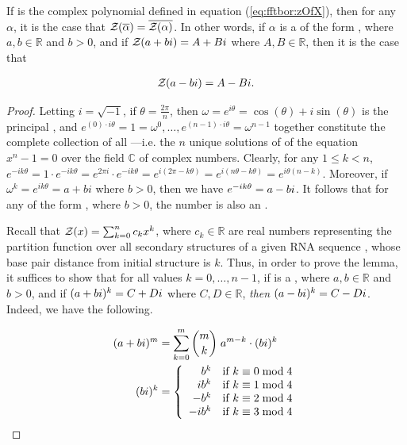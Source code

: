 \begin{lemma}
\label{lem:fftbor:compconj}

If \emZ{} is the complex polynomial defined in
equation (\ref{eq:fftbor:zOfX}), then for any \nRoU
 $\alpha$, it is the case that ${\mathcal Z}_{}(\overline{\alpha}) =
\overline{{\mathcal Z}_{}(\alpha)}$. In other words, if $\alpha$ is a \nRoU
 of the form \aPbi, where $a,b \in \mathbb{R}$ and $b>0$, and
if ${\mathcal Z}_{}(a+bi) = A + Bi$ where $A,B \in \mathbb{R}$, then it is the case that

\begin{align}
{\mathcal Z}_{}(a-bi) = A - Bi.
\end{align}

\end{lemma}

\begin{proof}
Letting $i = \sqrt{-1}$, if
$\theta = \frac{2 \pi}{n}$, then
$\omega = e^{i \theta} = \cos(\theta) + i \sin(\theta)$
is the principal \nRoU, and
$e^{(0) \cdot i \theta} = 1 = \omega^{0}, \dots ,
e^{(n-1) \cdot i \theta} = \omega^{n-1}$ together
constitute the complete collection of all
\nRoUs---i.e. the $n$ unique solutions of
of the equation $x^n -1 = 0$ over the field $\mathbb{C}$ of complex numbers.
Clearly, for any $1 \leq k < n$,
$e^{-i k \theta} = 1 \cdot e^{-i k \theta} =
e^{2 \pi i} \cdot e^{-i k \theta} = e^{i(2 \pi - k \theta)} =
e^{i(n \theta - k \theta)} = e^{i \theta (n - k)}$.
Moreover, if $\omega^k = e^{i k \theta} = a + b i$ where
$b>0$, then we have $e^{-i k \theta} = a-bi$. It follows that for any
\nRoU of the form \aPbi, where $b>0$, the number \aMbi
is also an \nRoU.

Recall that ${\mathcal Z}_{}(x) = \sum_{k=0}^n c_k x^k$, where
$c_k \in \mathbb{R}$ are real numbers representing the partition function
 over
all secondary structures of a given RNA sequence \seqN,
whose base pair distance from initial structure
\strSt is $k$. Thus, in order to prove the lemma, it suffices to show
that for all values $k=0,\dots,n-1$, if \aPbi is a
\nRoU, where $a,b \in \mathbb{R}$
and $b>0$, and if $(a+bi)^k = C+Di$ where $C,D \in \mathbb{R}$, {\em then}
$(a-bi)^k = C-Di$. Indeed, we have the following.

\begin{align}
(a+bi)^m &= \sum_{k=0}^m {m \choose k}\; a^{m-k} \cdot (bi)^k \\
(bi)^k  &= \left\{
\begin{array}{rl}
b^k    & \text{if $k \equiv 0 \bmod 4$} \\
i b^k  & \text{if $k \equiv 1 \bmod 4$} \\
-b^k   & \text{if $k \equiv 2 \bmod 4$} \\
-i b^k & \text{if $k \equiv 3 \bmod 4$} \\
\end{array} \right.
\end{align}


\end{proof}
